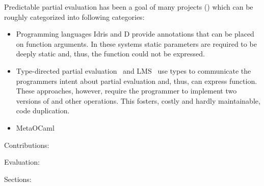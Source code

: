 Predictable partial evaluation has been a goal of many projects () which can be roughly categorized into following categories:
\begin{itemize}
\item Programming languages Idris and D provide annotations  that can be placed on function arguments. In these systems static parameters are required to be deeply static and, thus, the  function could not be expressed.
\item Type-directed partial evaluation~\cite{danvy1999type} and LMS~\cite{rompf2012lightweight} use types to communicate the programmers intent about partial evaluation and, thus, can express  function. These approaches, however, require the programmer to implement two versions of  and other operations. This fosters, costly and hardly maintainable, code duplication.
\item MetaOCaml~\cite{taha_multi-stage_1997}
\end{itemize}

Contributions:

Evaluation:

Sections:
